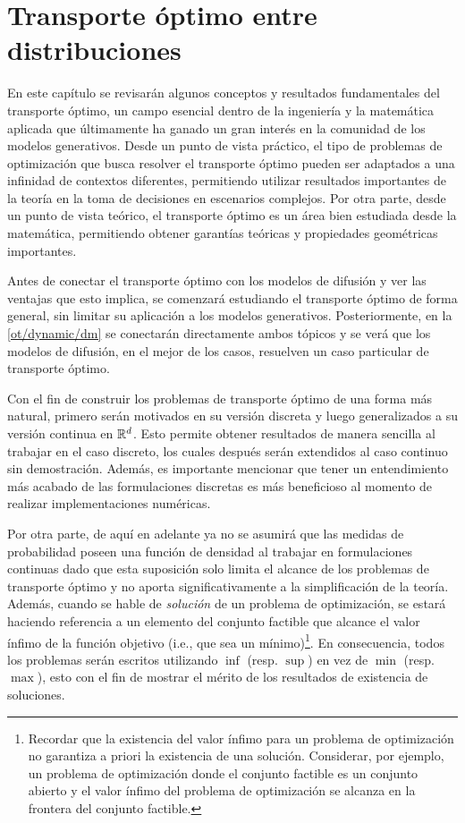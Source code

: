 \chapter{Transporte óptimo entre distribuciones}
\label{ot}

En este capítulo se revisarán algunos conceptos y resultados fundamentales del transporte óptimo, un campo esencial dentro de la ingeniería y la matemática aplicada que últimamente ha ganado un gran interés en la comunidad de los modelos generativos. Desde un punto de vista práctico, el tipo de problemas de optimización que busca resolver el transporte óptimo pueden ser adaptados a una infinidad de contextos diferentes, permitiendo utilizar resultados importantes de la teoría en la toma de decisiones en escenarios complejos. Por otra parte, desde un punto de vista teórico, el transporte óptimo es un área bien estudiada desde la matemática, permitiendo obtener garantías teóricas y propiedades geométricas importantes.

Antes de conectar el transporte óptimo con los modelos de difusión y ver las ventajas que esto implica, se comenzará estudiando el transporte óptimo de forma general, sin limitar su aplicación a los modelos generativos. Posteriormente, en la \autoref{ot/dynamic/dm} se conectarán directamente ambos tópicos y se verá que los modelos de difusión, en el mejor de los casos, resuelven un caso particular de transporte óptimo.

Con el fin de construir los problemas de transporte óptimo de una forma más natural, primero serán motivados en su versión discreta y luego generalizados a su versión continua en $\mathbb{R}^d$. Esto permite obtener resultados de manera sencilla al trabajar en el caso discreto, los cuales después serán extendidos al caso continuo sin demostración. Además, es importante mencionar que tener un entendimiento más acabado de las formulaciones discretas es más beneficioso al momento de realizar implementaciones numéricas.

Por otra parte, de aquí en adelante ya no se asumirá que las medidas de probabilidad poseen una función de densidad al trabajar en formulaciones continuas dado que esta suposición solo limita el alcance de los problemas de transporte óptimo y no aporta significativamente a la simplificación de la teoría. Además, cuando se hable de \textit{solución} de un problema de optimización, se estará haciendo referencia a un elemento del conjunto factible que alcance el valor ínfimo de la función objetivo (i.e., que sea un mínimo)\footnote{Recordar que la existencia del valor ínfimo para un problema de optimización no garantiza a priori la existencia de una solución. Considerar, por ejemplo, un problema de optimización donde el conjunto factible es un conjunto abierto y el valor ínfimo del problema de optimización se alcanza en la frontera del conjunto factible.}. En consecuencia, todos los problemas serán escritos utilizando $\inf$ (resp. $\sup$) en vez de $\min$ (resp. $\max$), esto con el fin de mostrar el mérito de los resultados de existencia de soluciones.

